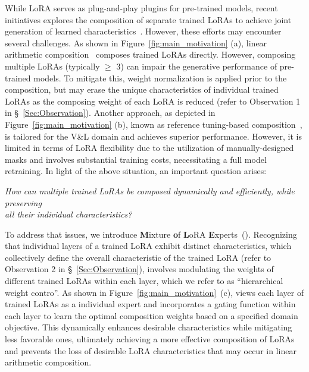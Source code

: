 While LoRA serves as plug-and-play plugins for pre-trained models, recent initiatives explores the composition of separate trained LoRAs to achieve joint generation of learned characteristics~\citep{huang2023lorahub,zhang2023composing,ruiz2023dreambooth}. However, these efforts may encounter several challenges.
As shown in Figure~\ref{fig:main_motivation} (a), linear arithmetic composition~\citep{zhang2023composing,huang2023lorahub,han2023svdiff} composes trained LoRAs directly. However, composing multiple LoRAs (typically $\geq$ 3) can impair the generative performance of pre-trained models. To mitigate this, weight normalization is applied prior to the composition, but may erase the unique characteristics of individual trained LoRAs as the composing weight of each LoRA is reduced (refer to Observation 1 in \S~\ref{Sec:Observation}). 
Another approach, as depicted in Figure~\ref{fig:main_motivation} (b), known as reference tuning-based composition~\citep{gu2023mix}, is tailored for the V\&L domain and achieves superior performance. However, it is limited in terms of LoRA flexibility due to the utilization of manually-designed masks and involves substantial training costs, necessitating a full model retraining.
In light of the above situation, an important question arises:

\begin{tcolorbox}[colback=gray!20, colframe=gray!50, sharp corners, center title]
\centering
\textit{\small How can multiple trained LoRAs be composed dynamically and efficiently, while preserving \\ all their individual characteristics?}
\end{tcolorbox}

To address that issues, we introduce \textbf{M}ixture \textbf{o}f \textbf{L}oRA \textbf{E}xperts~(\textbf{\our{}}). Recognizing that individual layers of a trained LoRA exhibit distinct characteristics, which collectively define the overall characteristic of the trained LoRA (refer to Observation 2 in \S~\ref{Sec:Observation}), \our{} involves modulating the weights of different trained LoRAs within each layer, which we refer to as ``hierarchical weight contro''. As shown in Figure~\ref{fig:main_motivation}~(c), \our{} views each layer of trained LoRAs as a individual expert and incorporates a gating function within each layer to learn the optimal composition weights based on a specified domain objective. This dynamically enhances desirable characteristics while mitigating less favorable ones, ultimately achieving a more effective composition of LoRAs and prevents the loss of desirable LoRA characteristics that may occur in linear arithmetic composition.

